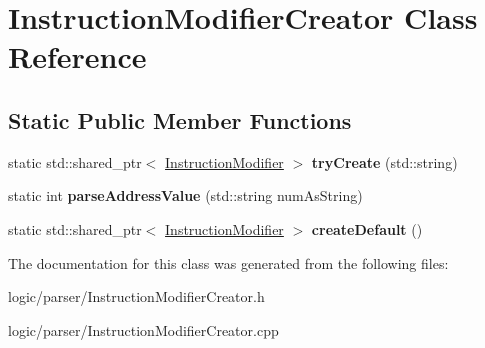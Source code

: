 \hypertarget{classInstructionModifierCreator}{}\section{Instruction\+Modifier\+Creator Class Reference}
\label{classInstructionModifierCreator}
\subsection*{Static Public Member Functions}
\begin{DoxyCompactItemize}
\item 
\mbox{\label{classInstructionModifierCreator_aacc346f4ae622c29e8492dc093570dee}} 
static std\+::shared\+\_\+ptr$<$ \hyperlink{classInstructionModifier}{Instruction\+Modifier} $>$ {\bfseries try\+Create} (std\+::string)
\item 
\mbox{\label{classInstructionModifierCreator_ae27a5b74da39fc74028db9c4efc01ad5}} 
static int {\bfseries parse\+Address\+Value} (std\+::string num\+As\+String)
\item 
\mbox{\label{classInstructionModifierCreator_a10376ec1982ca1a51d70251e6192390c}} 
static std\+::shared\+\_\+ptr$<$ \hyperlink{classInstructionModifier}{Instruction\+Modifier} $>$ {\bfseries create\+Default} ()
\end{DoxyCompactItemize}


The documentation for this class was generated from the following files\+:\begin{DoxyCompactItemize}
\item 
logic/parser/Instruction\+Modifier\+Creator.\+h\item 
logic/parser/Instruction\+Modifier\+Creator.\+cpp\end{DoxyCompactItemize}
